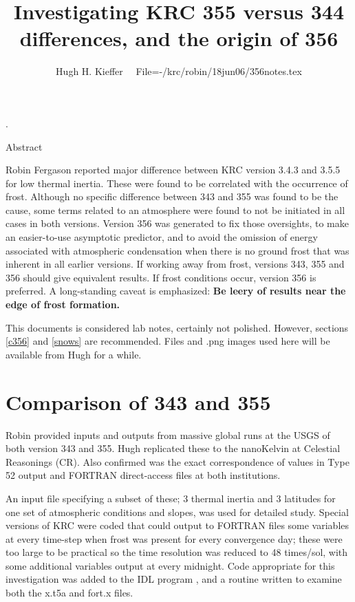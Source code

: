 \documentclass{article}
\title{Investigating KRC 355 versus 344 differences, and the origin of 356}
\author{Hugh H. Kieffer  \ \ File=-/krc/robin/18jun06/356notes.tex}
\begin{document}
\maketitle

\setlength{\baselineskip}{8.pt} 
\tableofcontents
\listoffigures
 \setlength{\baselineskip}{12.pt} 

\hrulefill .\hrulefill

 \begin{center} {\large{Abstract}} \end{center}

Robin Fergason reported major difference between KRC version 3.4.3 and 3.5.5 for
low thermal inertia. These were found to be correlated with the occurrence of
frost. Although no specific difference between 343 and 355 was found to be the
cause, some terms related to an atmosphere were found to not be initiated in all
cases in both versions. Version 356 was generated to fix those oversights, to
make an easier-to-use asymptotic predictor, and to avoid the omission of energy
associated with atmospheric condensation when there is no ground frost that was
inherent in all earlier versions.  If working away from frost, versions 343, 355 and 356 should give equivalent results. If frost conditions occur, version 356 is preferred. A long-standing caveat is emphasized: \qii
\textbf{Be leery of results near the edge of frost formation.}

This documents is considered lab notes, certainly not polished. However, sections \ref{c356} and \ref{snows} are recommended.
Files and .png images used here will be available from Hugh for a while.

\section{Comparison of 343 and 355}
Robin provided inputs and outputs from massive global runs at the USGS of both
version 343 and 355. Hugh replicated these to the nanoKelvin at Celestial
Reasonings (CR). Also confirmed was the exact correspondence of values in Type
52 output and FORTRAN direct-access files at both institutions.

An input file specifying a subset of these; 3 thermal inertia and 3 latitudes
for one set of atmospheric conditions and slopes, was used for detailed
study. Special versions of KRC were coded that could output to FORTRAN files
some variables at every time-step when frost was present for every convergence
day; these were too large to be practical so the time resolution was reduced to
48 times/sol, with some additional variables output at every midnight. Code
appropriate for this investigation was added to the IDL program , and a
routine  written to examine both the x.t5a and fort.x files.
\end{document}
